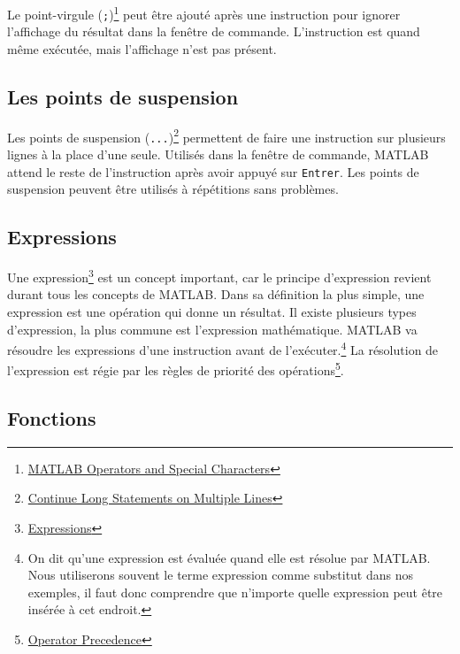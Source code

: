 \documentclass[]{tufte-handout}
\newcommand{\passthrough}[1]{#1}
\begin{document}
Le point-virgule (\passthrough{\lstinline!;!})\footnote{\href{https://www.mathworks.com/help/matlab/matlab_prog/matlab-operators-and-special-characters.html}{MATLAB
  Operators and Special Characters}} peut être ajouté après une
instruction pour ignorer l'affichage du résultat dans la fenêtre de
commande. L'instruction est quand même exécutée, mais l'affichage n'est
pas présent.

\hypertarget{les-points-de-suspension}{%
\subsection{Les points de suspension}\label{les-points-de-suspension}}

Les points de suspension (\passthrough{\lstinline!...!})\footnote{\href{https://www.mathworks.com/help/matlab/matlab_prog/continue-long-statements-on-multiple-lines.html}{Continue
  Long Statements on Multiple Lines}} permettent de faire une
instruction sur plusieurs lignes à la place d'une seule. Utilisés dans
la fenêtre de commande, MATLAB attend le reste de l'instruction après
avoir appuyé sur \passthrough{\lstinline!Entrer!}. Les points de
suspension peuvent être utilisés à répétitions sans problèmes.

\hypertarget{expressions}{%
\subsection{Expressions}\label{expressions}}

Une expression\footnote{\href{https://www.mathworks.com/help/matlab/learn_matlab/expressions.html}{Expressions}}
est un concept important, car le principe d'expression revient durant
tous les concepts de MATLAB. Dans sa définition la plus simple, une
expression est une opération qui donne un résultat. Il existe plusieurs
types d'expression, la plus commune est l'expression mathématique.
MATLAB va résoudre les expressions d'une instruction avant de
l'exécuter.\footnote{On dit qu'une expression est évaluée quand elle est
  résolue par MATLAB. Nous utiliserons souvent le terme expression comme
  substitut dans nos exemples, il faut donc comprendre que n'importe
  quelle expression peut être insérée à cet endroit.} La résolution de
l'expression est régie par les règles de priorité des
opérations\footnote{\href{https://www.mathworks.com/help/matlab/matlab_prog/operator-precedence.html}{Operator
  Precedence}}.

\hypertarget{fonctions}{%
\subsection{Fonctions}\label{fonctions}}
\end{document}

